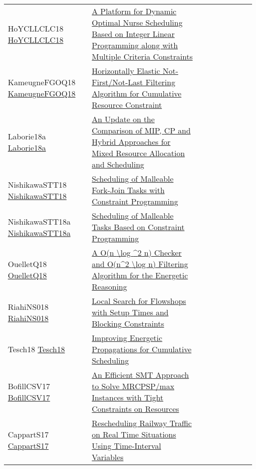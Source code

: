 {\begin{longtable}{p{3cm}p{7cm}lllllll}
HoYCLLCLC18 \href{https://doi.org/10.1145/3299819.3299825}{HoYCLLCLC18} &  \href{papers/HoYCLLCLC18.pdf}{A Platform for Dynamic Optimal Nurse Scheduling Based on Integer Linear Programming along with Multiple Criteria Constraints} &  &  &  &  &  &  & \\
KameugneFGOQ18 \href{https://doi.org/10.1007/978-3-319-93031-2\_23}{KameugneFGOQ18} &  \href{papers/KameugneFGOQ18.pdf}{Horizontally Elastic Not-First/Not-Last Filtering Algorithm for Cumulative Resource Constraint} &  &  &  &  &  &  & \\
Laborie18a \href{https://doi.org/10.1007/978-3-319-93031-2\_29}{Laborie18a} &  \href{papers/Laborie18a.pdf}{An Update on the Comparison of MIP, {CP} and Hybrid Approaches for Mixed Resource Allocation and Scheduling} &  &  &  &  &  &  & \\
NishikawaSTT18 \href{https://doi.org/10.1109/CANDAR.2018.00025}{NishikawaSTT18} &  \href{papers/NishikawaSTT18.pdf}{Scheduling of Malleable Fork-Join Tasks with Constraint Programming} &  &  &  &  &  &  & \\
NishikawaSTT18a \href{https://doi.org/10.1109/TENCON.2018.8650168}{NishikawaSTT18a} &  \href{papers/NishikawaSTT18a.pdf}{Scheduling of Malleable Tasks Based on Constraint Programming} &  &  &  &  &  &  & \\
OuelletQ18 \href{https://doi.org/10.1007/978-3-319-93031-2\_34}{OuelletQ18} &  \href{papers/OuelletQ18.pdf}{A O(n {\textbackslash}log {\^{}}2 n) Checker and O(n{\^{}}2 {\textbackslash}log n) Filtering Algorithm for the Energetic Reasoning} &  &  &  &  &  &  & \\
RiahiNS018 \href{https://aaai.org/ocs/index.php/ICAPS/ICAPS18/paper/view/17755}{RiahiNS018} &  \href{papers/RiahiNS018.pdf}{Local Search for Flowshops with Setup Times and Blocking Constraints} &  &  &  &  &  &  & \\
Tesch18 \href{https://doi.org/10.1007/978-3-319-98334-9\_41}{Tesch18} &  \href{papers/Tesch18.pdf}{Improving Energetic Propagations for Cumulative Scheduling} &  &  &  &  &  &  & \\
BofillCSV17 \href{https://doi.org/10.1007/978-3-319-66158-2\_5}{BofillCSV17} &  \href{papers/BofillCSV17.pdf}{An Efficient {SMT} Approach to Solve MRCPSP/max Instances with Tight Constraints on Resources} &  &  &  &  &  &  & \\
CappartS17 \href{https://doi.org/10.1007/978-3-319-59776-8\_26}{CappartS17} &  \href{papers/CappartS17.pdf}{Rescheduling Railway Traffic on Real Time Situations Using Time-Interval Variables} &  &  &  &  &  &  & \\

\end{longtable}}
